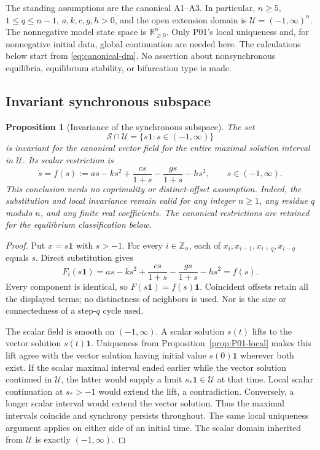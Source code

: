 \documentclass[11pt]{article}
\newcommand{\R}{\mathbb{R}}
\newcommand{\Zn}{\mathbb{Z}_n}
\newcommand{\one}{\mathbf{1}}
\newcommand{\Sync}{\mathcal{S}}
\newcommand{\Orth}{\R_{\geq 0}^{n}}
\newcommand{\Domain}{\mathcal{U}}
\newtheorem{proposition}[theorem]{Proposition}
\theoremstyle{definition}
\theoremstyle{remark}
\begin{document}
The standing assumptions are the canonical A1--A3. In particular,
$n\ge5$, $1\le q\le n-1$, $a,k,c,g,h>0$, and the open extension
domain is $\Domain=(-1,\infty)^n$. The nonnegative model state space
is $\Orth$. Only P01's local uniqueness and, for nonnegative initial data, global continuation are needed here.
The calculations below start from \eqref{eq:canonical-dm}.
No assertion about nonsynchronous equilibria, equilibrium stability,
or bifurcation type is made.

\subsection{Invariant synchronous subspace}
\label{slot:P02-1}

\begin{proposition}[Invariance of the synchronous subspace]
\label{prop:P02-invariance}
The set
\[
 \Sync\cap\Domain=\{s\one:s\in(-1,\infty)\}
\]
is invariant for the canonical vector field for the entire maximal
solution interval in $\Domain$. Its scalar restriction is
\begin{equation}
\label{eq:P02-scalar-original}
 \dot s=f(s):=as-ks^2+\frac{cs}{1+s}
                     -\frac{gs}{1+s}-hs^2,
 \qquad s\in(-1,\infty).
\end{equation}
This conclusion needs no coprimality or distinct-offset assumption.
Indeed, the substitution and local invariance remain valid for any
integer $n\ge1$, any residue $q$ modulo $n$, and any finite real
coefficients. The canonical restrictions are retained for the
equilibrium classification below.
\end{proposition}

\begin{proof}
Put $x=s\one$ with $s>-1$. For every $i\in\Zn$, each of
$x_i,x_{i-1},x_{i+q},x_{i-q}$ equals $s$. Direct substitution gives
\[
 F_i(s\one)=as-ks^2+\frac{cs}{1+s}
                        -\frac{gs}{1+s}-hs^2=f(s).
\]
Every component is identical, so $F(s\one)=f(s)\one$.
Coincident offsets retain all the displayed terms; no distinctness
of neighbors is used. Nor is the size or connectedness of a
step-$q$ cycle used.

The scalar field is smooth on $(-1,\infty)$. A scalar solution
$s(t)$ lifts to the vector solution $s(t)\one$. Uniqueness from
Proposition~\ref{prop:P01-local} makes this lift agree with the
vector solution having initial value $s(0)\one$ wherever both exist.
If the scalar maximal interval ended earlier while the vector
solution continued in $\Domain$, the latter would supply a limit
$s_*\one\in\Domain$ at that time. Local scalar continuation at
$s_*>-1$ would extend the lift, a contradiction. Conversely, a longer
scalar interval would extend the vector solution. Thus the maximal
intervals coincide and synchrony persists throughout. The same local
uniqueness argument applies on either side of an initial time.
The scalar domain inherited from $\Domain$ is exactly $(-1,\infty)$.
\end{proof}
\end{document}
